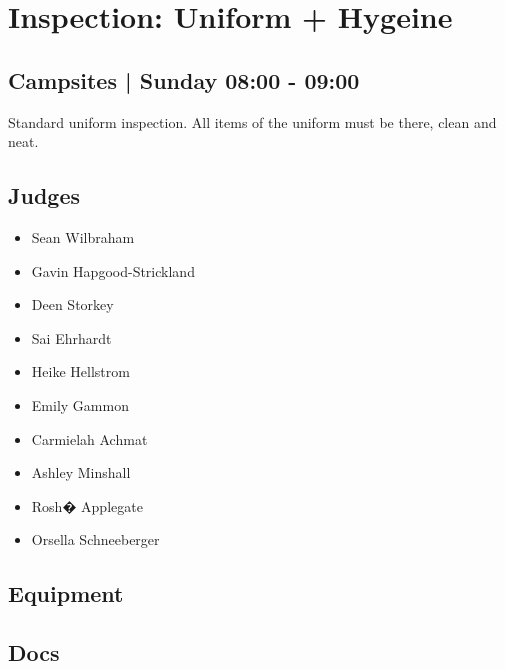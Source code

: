 \documentclass[10pt]{article}
\begin{document}
		\begin{minipage}{\linewidth}
		\setcounter{section}{27}
	\section{Inspection: Uniform + Hygeine }
	\subsection*{Campsites | Sunday 08:00 - 09:00}

	Standard uniform inspection. All items of the uniform must be there, clean and neat. 

	\begin{multicols}{2}
	\subsection*{\faUsers \: Judges}
	\begin{itemize}
			\item Sean Wilbraham
			\item Gavin Hapgood-Strickland
			\item Deen Storkey
			\item Sai Ehrhardt
			\item Heike Hellstrom
			\item Emily Gammon
			\item Carmielah Achmat
			\item Ashley Minshall
			\item Rosh� Applegate
			\item Orsella Schneeberger
		\end{itemize}
	\columnbreak
	\subsection*{\faWrench \: Equipment}
	        \vfill\null
        \subsection*{\faFile \: Docs}
     	\end{multicols}


	\vspace{1cm}
	\end{minipage}
\end{document}
